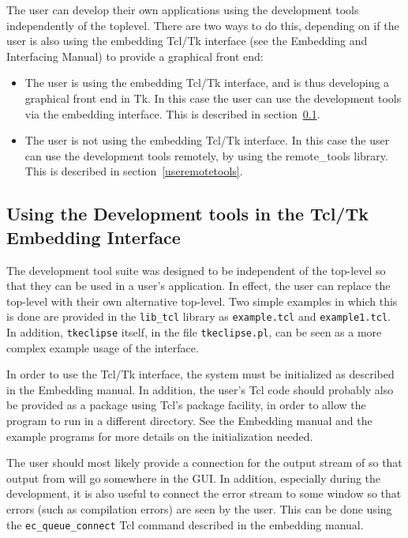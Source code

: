 The user can develop their own {\eclipse} applications using the
development tools independently of the {\tkeclipse} toplevel. There are two
ways to do this, depending on if the user is also using the embedding Tcl/Tk
interface (see the Embedding and Interfacing Manual) to provide a graphical
front end:

\begin{itemize}
\item The user is using the embedding Tcl/Tk interface, and is thus
developing a graphical front end in Tk. In this case the user can use the
 development tools via the embedding interface. This is described in
 section~\ref{embedtools}.
\item The user is not using the embedding Tcl/Tk interface. In this case
 the user can use the development tools remotely, by using the remote_tools
 library. This is described in section~\ref{useremotetools}.
\end{itemize}

\subsection{Using the Development tools in the Tcl/Tk Embedding Interface}
\label{embedtools}

 The development tool suite was
designed to be independent of the {\tkeclipse} top-level so that they can be
used in a user's application. In effect, the user can replace the
{\tkeclipse}
top-level with their own alternative top-level. Two simple examples in
which this is done are provided in the \verb'lib_tcl' library as
\verb'example.tcl' and \verb'example1.tcl'. In addition, \verb'tkeclipse'
itself, in the file \verb'tkeclipse.pl', can be seen as a more complex
example usage of the interface.

In order to use the Tcl/Tk interface, the system must be initialized as
described in the Embedding manual. In addition, the user's Tcl code should
probably also be provided as a package using Tcl's package facility, in
order to allow the program to run in a different directory. See the
Embedding manual and the example programs for more details on the
initialization needed.

The user should most likely provide a connection for the output stream
of {\eclipse} so that output from {\eclipse} will go somewhere in the GUI. In
addition, especially during the development, it is also useful to connect
the error stream to some window so that errors (such as {\eclipse}
compilation errors) are seen by the user. This can be done using the
\verb'ec_queue_connect' Tcl command described in the embedding manual.

